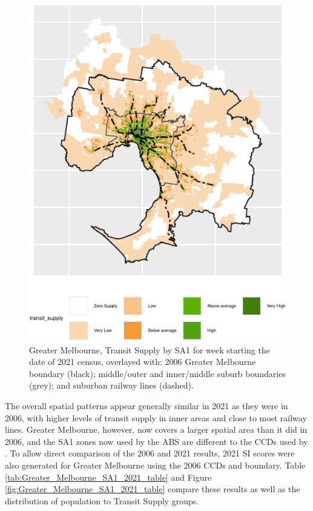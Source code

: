 \documentclass[preprint, 3p,
authoryear]{elsarticle} %
\begin{document}
\begin{figure}
\includegraphics[width=1\linewidth]{Leveraging_GTFS_to_assess_transit_supply_Transport_Geography_files/figure-latex/Greater_Melbourne_SA1_2021_plot-1} \caption{Greater Melbourne, Transit Supply by SA1 for week starting the date of 2021 census, overlayed with: 2006 Greater Melbourne boundary (black); middle/outer and inner/middle suburb boundaries (grey); and suburban railway lines (dashed).}\label{fig:Greater_Melbourne_SA1_2021_plot}
\end{figure}

The overall spatial patterns appear generally similar in 2021 as they
were in 2006, with higher levels of transit supply in inner areas and
close to most railway lines. Greater Melbourne, however, now covers a
larger spatial area than it did in 2006, and the SA1 zones now used by
the ABS are different to the CCDs used by \citet{currie2010identifying}.
To allow direct comparison of the 2006 and 2021 results, 2021 SI scores
were also generated for Greater Melbourne using the 2006 CCDs and
boundary. Table \ref{tab:Greater_Melbourne_SA1_2021_table} and Figure
\ref{fig:Greater_Melbourne_SA1_2021_table} compare these results as well
as the distribution of population to Transit Supply groups.
\end{document}
